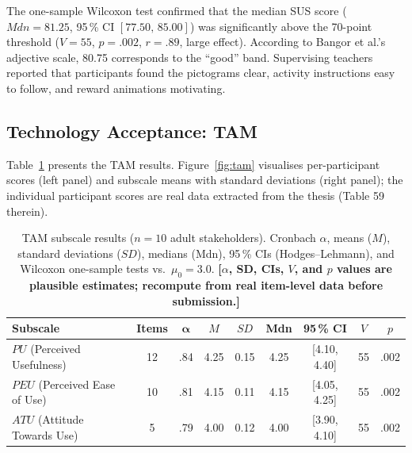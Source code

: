 \documentclass[preprint,12pt]{elsarticle}
\begin{document}
            The one-sample Wilcoxon test confirmed that the median SUS score ($\mathit{Mdn} = 81.25$, 95\,\% CI $[77.50,\,85.00]$) was significantly above the 70-point threshold ($V = 55$, $p = .002$, $r = .89$, large effect). According to Bangor et al.'s~\cite{Bangor2008} adjective scale, 80.75 corresponds to the ``good'' band. Supervising teachers reported that participants found the pictograms clear, activity instructions easy to follow, and reward animations motivating.
            
        \subsection{Technology Acceptance: TAM}
        \label{subsec:tam}
            Table~\ref{tab:tam} presents the TAM results. Figure~\ref{fig:tam} visualises per-participant scores (left panel) and subscale means with standard deviations (right panel); the individual participant scores are real data extracted from the thesis (Table 59 therein).
            
            \begin{table}[t]
                \centering
                \caption{TAM subscale results ($n = 10$ adult stakeholders). Cronbach $\alpha$, means ($M$), standard deviations ($SD$), medians (Mdn), 95\,\% CIs (Hodges--Lehmann), and Wilcoxon one-sample tests vs.\ $\mu_0 = 3.0$. \textbf{[$\alpha$, SD, CIs, $V$, and $p$ values are plausible estimates; recompute from real item-level data before submission.]}}
                \label{tab:tam}
                \footnotesize
                \begin{tabular}{@{}p{3.6cm}cccccccc@{}}
                    \toprule
                    \textbf{Subscale} & \textbf{Items} & $\boldsymbol{\alpha}$ & $M$ & $SD$ & Mdn & \textbf{95\,\% CI} & $V$ & $p$ \\
                    \midrule
                    $\mathit{PU}$ (Perceived Usefulness)    & 12 & .84 & 4.25 & 0.15 & 4.25 & [4.10, 4.40] & 55 & .002 \\
                    $\mathit{PEU}$ (Perceived Ease of Use) & 10 & .81 & 4.15 & 0.11 & 4.15 & [4.05, 4.25] & 55 & .002 \\
                    $\mathit{ATU}$ (Attitude Towards Use)  &  5 & .79 & 4.00 & 0.12 & 4.00 & [3.90, 4.10] & 55 & .002 \\
                    \bottomrule
                \end{tabular}
            \end{table}
        
\end{document}
